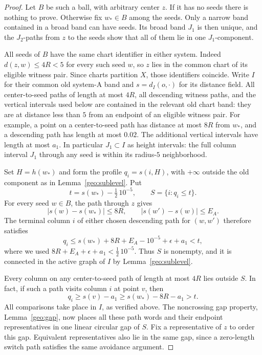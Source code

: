 \begin{proof}
Let $B$ be such a ball, with arbitrary center $z$.  If it has no
seeds there is nothing to prove.  Otherwise fix $w_*\in B$ among
the seeds.  Only a narrow band contained in a broad band can have
seeds.  Its broad band $J_1$ is then unique, and the $J_2$-paths
from $z$ to the seeds show that all of them lie in one
$J_1$-component.

All seeds of $B$ have the same chart identifier in either system.
Indeed $d(z,w)\le4R<5$ for every such seed $w$, so $z$ lies in
the common chart of its eligible witness pair.  Since charts
partition $X$, those identifiers coincide.  Write $I$ for their
common old system-A band and $s=d_I(o,\cdot)$ for its distance
field.  All center-to-seed paths of length at most $4R$, all
descending witness paths, and the vertical intervals used below
are contained in the relevant old chart band: they are at distance
less than $5$ from an endpoint of an eligible witness pair.
For example, a point on a center-to-seed path has distance at most
$8R$ from $w_*$, and a descending path has length at most $0.02$.
The additional vertical intervals have length at most $a_1$.
In particular $J_1\subset I$ as height intervals: the full column
interval $J_1$ through any seed is within its radius-$5$
neighborhood.

Set $H=h(w_*)$ and form the profile $q_i=s(i,H)$, with $+\infty$
outside the old component as in Lemma~\ref{geo:sublevel}.  Put
\begin{equation}
 t=s(w_*)-\tfrac12\,10^{-5},\qquad S=\{i:q_i\le t\}.
 \label{pack:low-set}
\end{equation}
For every seed $w\in B$, the path through $z$ gives
\[
 |s(w)-s(w_*)|\le8R,
 \qquad |s(w')-s(w)|\le E_A.
\]
The terminal column $i$ of either chosen descending path for
$(w,w')$ therefore satisfies
\[
 q_i\le s(w_*)+8R+E_A-10^{-5}+\epsilon+a_1<t,
\]
where we used
$8R+E_A+\epsilon+a_1<\tfrac12\,10^{-5}$.
Thus $S$ is nonempty, and it is connected in the active graph
of $I$ by Lemma~\ref{geo:sublevel}.

Every column on any center-to-seed path of length at most $4R$
lies outside $S$.  In fact, if such a path visits column $i$ at
point $v$, then
\[
 q_i\ge s(v)-a_1\ge s(w_*)-8R-a_1>t.
\]
All comparisons take place in $I$, as verified above.  The
noncrossing gap property, Lemma~\ref{geo:gap}, now places all
these path words and their endpoint representatives in one
linear circular gap of $S$.  Fix a representative of $z$ to
order this gap.  Equivalent representatives also lie in the
same gap, since a zero-length switch path satisfies the same
avoidance argument.


\end{proof}
